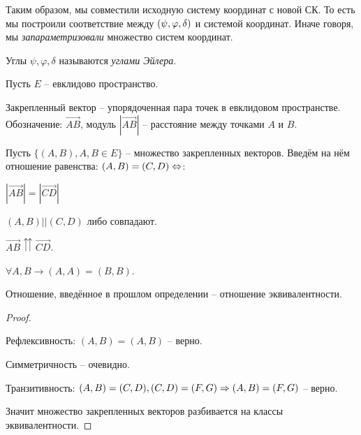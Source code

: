 	\begin{figure}[h]
		\centering
		\def\svgwidth{0.3\columnwidth}
		
	\end{figure}

	Таким образом, мы совместили исходную систему координат с новой СК. То есть
	мы построили соответствие между $(\psi, \varphi, \delta)$ и системой координат.
	Иначе говоря, мы \textit{запараметризовали} множество систем координат. 

	\begin{Rem}
		Углы $\psi, \varphi, \delta$ называются \textit{углами Эйлера}. 
	\end{Rem}


	Пусть $E$ -- евклидово пространство.
	\begin{Def}
		Закрепленный вектор -- упорядоченная пара точек в евклидовом пространстве.
		Обозначение: $\overrightarrow{AB}$, модуль $|\overrightarrow{AB}|$ -- расстояние между точками $A$ и $B$.
	\end{Def}

	\begin{Def}
		Пусть $\{(A, B), A, B \in E\}$ -- множество закрепленных векторов. Введём на нём отношение равенства:
		$(A, B) = (C, D) \Leftrightarrow$:
		\begin{MyList}
			\item $|\overrightarrow{AB}| = |\overrightarrow{CD}|$ 
			\item $(A, B) || (C, D)$ либо совпадают.
			\item $\overrightarrow{AB} \upuparrows \overrightarrow{CD}$. 
		\end{MyList}
	\end{Def}

	\begin{Rem}
		$\forall A, B \to (A, A) = (B, B)$.
	\end{Rem}

	\begin{Prop}
		Отношение, введённое в прошлом определении -- отношение эквивалентности.
	\end{Prop}

	\begin{proof}
		\begin{MyList}
			\item Рефлексивность: $(A, B) = (A, B)$ -- верно.
			\item Симметричность -- очевидно.
			\item Транзитивность: $(A, B) = (C, D), (C, D) = (F, G) \Rightarrow (A, B) = (F, G)$ -- верно.
		\end{MyList}
		Значит множество закрепленных векторов разбивается на классы эквивалентности.
	\end{proof}

